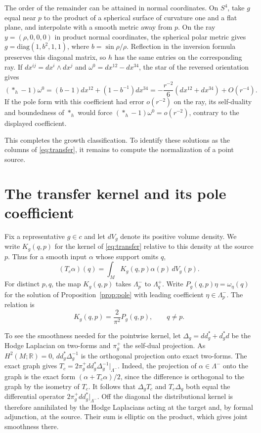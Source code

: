 \documentclass[11pt,letterpaper]{article}
\numberwithin{equation}{section}
\begin{document}
The order of the remainder can be attained in normal coordinates.
On \(S^4\), take \(g\) equal near \(p\) to the product of a spherical
surface of curvature one and a flat plane, and interpolate with a
smooth metric away from \(p\). On the ray \(y=(\rho,0,0,0)\) in product
normal coordinates, the spherical polar metric gives
\(g=\mathrm{diag}(1,b^2,1,1)\), where \(b=\sin\rho/\rho\).
Reflection in the inversion formula preserves this diagonal matrix,
so \(h\) has the same entries on the corresponding ray. If
\(dx^{ij}=dx^i\wedge dx^j\) and \(\omega^0=dx^{12}-dx^{34}\), the star
of the reversed orientation gives
\[
 (*_h-1)\omega^0
 =(b-1)dx^{12}+(1-b^{-1})dx^{34}
 =-\frac{r^{-2}}6(dx^{12}+dx^{34})+O(r^{-4}).
\]
If the pole form with this coefficient had error \(o(r^{-2})\) on the
ray, its self-duality and boundedness of \(*_h\) would force
\((*_h-1)\omega^0=o(r^{-2})\), contrary to the displayed coefficient.

This completes the growth classification. To identify these solutions as the
columns of \eqref{eq:transfer}, it remains to compute the normalization
of a point source.

\section{The transfer kernel and its pole coefficient}
\label{sec:transfer-kernel}

Fix a representative \(g\in c\) and let \(dV_g\) denote its positive
volume density. We write \(K_g(q,p)\) for the kernel of \eqref{eq:transfer}
relative to this density at the source \(p\). Thus for a smooth input
\(\alpha\) whose support omits \(q\),
\[
 (T_c\alpha)(q)=\int_M K_g(q,p)\alpha(p)\,dV_g(p).
\]
For distinct \(p,q\), the map \(K_g(q,p)\) takes \(\Lambda^-_p\) to
\(\Lambda^+_q\). Write \(P_g(q,p)\eta=\omega_\eta(q)\) for the solution
of Proposition~\ref{prop:pole} with leading coefficient
\(\eta\in\Lambda^-_p\). The relation is
\begin{equation}\label{eq:kernel-pole-normalization}
 K_g(q,p)=\frac{2}{\pi^2}P_g(q,p),\qquad q\ne p.
\end{equation}

To see the smoothness needed for the pointwise kernel, let
\(\Delta_g=dd_g^*+d_g^*d\) be the Hodge Laplacian on two-forms and
\(\pi_g^+\) the self-dual projection. As \(H^2(M;\mathbb R)=0\),
\(dd_g^*\Delta_g^{-1}\) is the orthogonal projection onto exact
two-forms. The exact graph gives
\(T_c=2\pi_g^+dd_g^*\Delta_g^{-1}|_{\Lambda^-}\).
Indeed, the projection of \(\alpha\in\Lambda^-\) onto the graph is the
exact form \((\alpha+T_c\alpha)/2\), since the difference is
orthogonal to the graph by the isometry of \(T_c\). It follows that
\(\Delta_g T_c\) and \(T_c\Delta_g\) both equal the differential operator
\(2\pi_g^+dd_g^*|_{\Lambda^-}\). Off the diagonal the distributional
kernel is therefore annihilated by the Hodge Laplacians acting at the
target and, by formal adjunction, at the source. Their sum is elliptic on
the product, which gives joint smoothness there.
\end{document}
